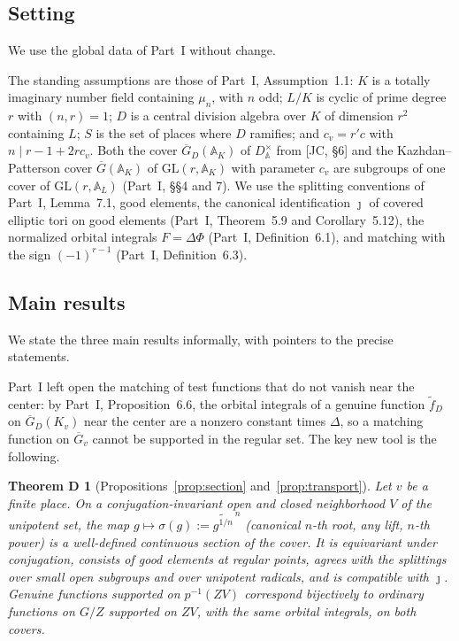 \documentclass[12pt]{article}
\newcommand{\ov}[1]{\overline{#1}}
\newcommand{\A}{\mathbb{A}}
\newcommand{\GL}{\mathrm{GL}}
\newcommand{\Gb}{\ov{G}}
\newcommand{\GDb}{\ov{G}_D}
\newcommand{\jj}{\jmath}
\newcommand{\sg}{\sigma}
\theoremstyle{plain}
\newtheorem*{theoremD}{Theorem D}
\theoremstyle{definition}
\begin{document}
\subsection{Setting}
We use the global data of Part~I without change.

The standing assumptions are those of Part~I, Assumption~1.1: $K$ is a totally imaginary number field containing $\mu_n$, with $n$ odd; $L/K$ is cyclic of prime degree $r$ with $(n,r)=1$; $D$ is a central division algebra over $K$ of dimension $r^2$ containing $L$; $S$ is the set of places where $D$ ramifies; and $c_v=r'c$ with $n\mid r-1+2rc_v$. Both the cover $\GDb(\A_K)$ of $D^\times_{\A}$ from [JC, \S6] and the Kazhdan--Patterson cover $\Gb(\A_K)$ of $\GL(r,\A_K)$ with parameter $c_v$ are subgroups of one cover of $\GL(r,\A_L)$ (Part~I, \S\S4 and 7). We use the splitting conventions of Part~I, Lemma~7.1, good elements, the canonical identification $\jj$ of covered elliptic tori on good elements (Part~I, Theorem~5.9 and Corollary~5.12), the normalized orbital integrals $F=\Delta\Phi$ (Part~I, Definition~6.1), and matching with the sign $(-1)^{r-1}$ (Part~I, Definition~6.3).

\subsection{Main results}\label{subsec:main}
We state the three main results informally, with pointers to the precise statements.

Part~I left open the matching of test functions that do not vanish near the center: by Part~I, Proposition~6.6, the orbital integrals of a genuine function $\tilde f_D$ on $\GDb(K_v)$ near the center are a nonzero constant times $\Delta$, so a matching function on $\Gb_v$ cannot be supported in the regular set. The key new tool is the following.

\begin{theoremD}[Propositions~\ref{prop:section} and~\ref{prop:transport}]
Let $v$ be a finite place. On a conjugation-invariant open and closed neighborhood $V$ of the unipotent set, the map $g\mapsto\sg(g):=\widetilde{g^{1/n}}^{\,n}$ (canonical $n$-th root, any lift, $n$-th power) is a well-defined continuous section of the cover. It is equivariant under conjugation, consists of good elements at regular points, agrees with the splittings over small open subgroups and over unipotent radicals, and is compatible with $\jj$. Genuine functions supported on $p^{-1}(ZV)$ correspond bijectively to ordinary functions on $G/Z$ supported on $ZV$, with the same orbital integrals, on both covers.
\end{theoremD}
\end{document}
